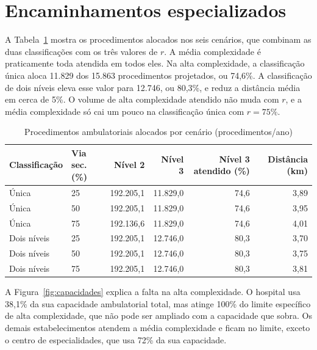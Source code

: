 \section{Encaminhamentos especializados}\label{sec:encaminhamentos}

A Tabela~\ref{tab:ambulatorial} mostra os procedimentos alocados nos seis cenários, que combinam as duas
classificações com os três valores de $r$. A média complexidade é praticamente toda atendida em todos
eles. Na alta complexidade, a classificação única aloca 11.829 dos 15.863 procedimentos projetados, ou
74,6\%. A classificação de dois níveis eleva esse valor para 12.746, ou 80,3\%, e reduz a distância média
em cerca de 5\%. O volume de alta complexidade atendido não muda com $r$, e a média
complexidade só cai um pouco na classificação única com $r=75\%$.

\begin{table}[htbp]\centering
\caption{Procedimentos ambulatoriais alocados por cenário (procedimentos/ano)}\label{tab:ambulatorial}
\setlength{\tabcolsep}{5pt}
\begin{tabular}{llrrrr}\toprule
Classificação & Via sec. (\%) & Nível 2 & Nível 3 & Nível 3 atendido (\%) & Distância (km)\\\midrule
Única & 25 & 192.205,1 & 11.829,0 & 74,6 & 3,89\\
Única & 50 & 192.205,1 & 11.829,0 & 74,6 & 3,95\\
Única & 75 & 192.136,6 & 11.829,0 & 74,6 & 4,01\\
Dois níveis & 25 & 192.205,1 & 12.746,0 & 80,3 & 3,70\\
Dois níveis & 50 & 192.205,1 & 12.746,0 & 80,3 & 3,75\\
Dois níveis & 75 & 192.205,1 & 12.746,0 & 80,3 & 3,81\\
\bottomrule\end{tabular}
\end{table}

A Figura~\ref{fig:capacidades} explica a falta na alta complexidade. O hospital usa 38,1\% da sua
capacidade ambulatorial total, mas atinge 100\% do limite específico de alta complexidade, que não pode
ser ampliado com a capacidade que sobra. Os demais estabelecimentos atendem a média complexidade e
ficam no limite, exceto o centro de especialidades, que usa 72\% da sua capacidade.

